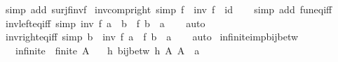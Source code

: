 \begin{isabellebody}
\ {\isacharparenleft}{\kern0pt}simp\ add{\isacharcolon}{\kern0pt}\ surj{\isacharunderscore}{\kern0pt}f{\isacharunderscore}{\kern0pt}inv{\isacharunderscore}{\kern0pt}f{\isacharparenright}{\kern0pt}%
\endisatagproof
{\isafoldproof}%
%
\isadelimproof
\isanewline
%
\endisadelimproof
\isanewline
{}\isamarkupfalse%
\ inv{\isacharunderscore}{\kern0pt}comp{\isacharunderscore}{\kern0pt}right\ {\isacharbrackleft}{\kern0pt}simp{\isacharbrackright}{\kern0pt}{\isacharcolon}{\kern0pt}\ {\isachardoublequoteopen}f\ {\isasymcirc}\ inv\ f\ {\isacharequal}{\kern0pt}\ id{\isachardoublequoteclose}\isanewline
%
\isadelimproof
\ \ %
\endisadelimproof
%
\isatagproof
{}\isamarkupfalse%
\ {\isacharparenleft}{\kern0pt}simp\ add{\isacharcolon}{\kern0pt}\ fun{\isacharunderscore}{\kern0pt}eq{\isacharunderscore}{\kern0pt}iff{\isacharparenright}{\kern0pt}%
\endisatagproof
{\isafoldproof}%
%
\isadelimproof
\isanewline
%
\endisadelimproof
\isanewline
{}\isamarkupfalse%
\ inv{\isacharunderscore}{\kern0pt}left{\isacharunderscore}{\kern0pt}eq{\isacharunderscore}{\kern0pt}iff\ {\isacharbrackleft}{\kern0pt}simp{\isacharbrackright}{\kern0pt}{\isacharcolon}{\kern0pt}\ {\isachardoublequoteopen}inv\ f\ a\ {\isacharequal}{\kern0pt}\ b\ {\isasymlongleftrightarrow}\ f\ b\ {\isacharequal}{\kern0pt}\ a{\isachardoublequoteclose}\isanewline
%
\isadelimproof
\ \ %
\endisadelimproof
%
\isatagproof
{}\isamarkupfalse%
\ auto%
\endisatagproof
{\isafoldproof}%
%
\isadelimproof
\isanewline
%
\endisadelimproof
\isanewline
{}\isamarkupfalse%
\ inv{\isacharunderscore}{\kern0pt}right{\isacharunderscore}{\kern0pt}eq{\isacharunderscore}{\kern0pt}iff\ {\isacharbrackleft}{\kern0pt}simp{\isacharbrackright}{\kern0pt}{\isacharcolon}{\kern0pt}\ {\isachardoublequoteopen}b\ {\isacharequal}{\kern0pt}\ inv\ f\ a\ {\isasymlongleftrightarrow}\ f\ b\ {\isacharequal}{\kern0pt}\ a{\isachardoublequoteclose}\isanewline
%
\isadelimproof
\ \ %
\endisadelimproof
%
\isatagproof
{}\isamarkupfalse%
\ auto%
\endisatagproof
{\isafoldproof}%
%
\isadelimproof
\isanewline
%
\endisadelimproof
\isanewline
{}\isamarkupfalse%
\isanewline
\isanewline
{}\isamarkupfalse%
\ infinite{\isacharunderscore}{\kern0pt}imp{\isacharunderscore}{\kern0pt}bij{\isacharunderscore}{\kern0pt}betw{\isacharcolon}{\kern0pt}\isanewline
\ \ \ infinite{\isacharcolon}{\kern0pt}\ {\isachardoublequoteopen}{\isasymnot}\ finite\ A{\isachardoublequoteclose}\isanewline
\ \ \ {\isachardoublequoteopen}{\isasymexists}h{\isachardot}{\kern0pt}\ bij{\isacharunderscore}{\kern0pt}betw\ h\ A\ {\isacharparenleft}{\kern0pt}A\ {\isacharminus}{\kern0pt}\ {\isacharbraceleft}{\kern0pt}a{\isacharbraceright}{\kern0pt}{\isacharparenright}{\kern0pt}{\isachardoublequoteclose}\isanewline

\end{isabellebody}
